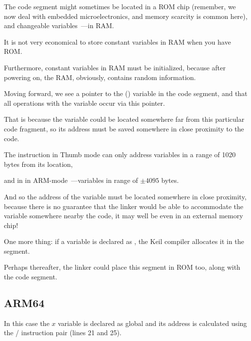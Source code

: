The code segment might sometimes be located in a \ac{ROM} chip (remember, we now deal
with embedded microelectronics, and memory scarcity is common here), and changeable 
variables~---in \ac{RAM}.

It is not very economical to store constant variables in RAM when you have ROM.

Furthermore, constant variables in RAM must be initialized, because after powering on, the RAM, obviously, contains random information.


Moving forward, we see a pointer to the  () variable in the code segment, and that all
operations with the variable occur via this pointer.

That is because the  variable could be located somewhere far from this particular code fragment, so its address
must be saved somewhere in close proximity to the code.

The  instruction in Thumb mode can only address variables in a range of 1020 bytes from its location, 

and in in ARM-mode~---variables in range of $\pm{}4095$ bytes.

And so the address of the  variable
must be located somewhere in close proximity, because there is no guarantee that the linker would be able to accommodate the variable somewhere nearby the code, it may well be even in an external memory chip!

\myindex{\ROM}

One more thing: if a variable is declared as , the Keil compiler allocates it in 
the  segment.

Perhaps thereafter, the linker could place this segment in ROM too, along with the code segment.

\subsection{ARM64}




In this case the $x$ variable is declared as global and its address is calculated using 
the / instruction pair (lines 21 and 25).

